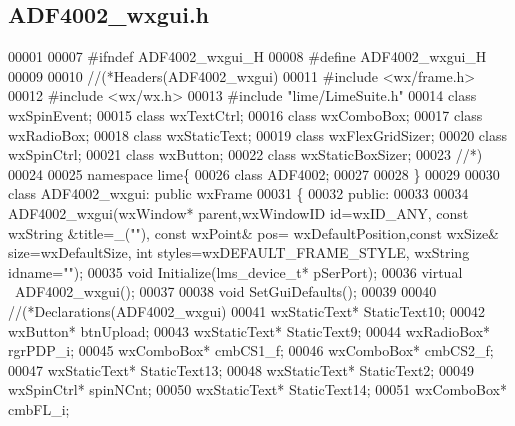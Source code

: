 \subsection{A\+D\+F4002\+\_\+wxgui.\+h}
\label{ADF4002__wxgui_8h_source}

\begin{DoxyCode}
00001 
00007 \textcolor{preprocessor}{#ifndef ADF4002\_wxgui\_H}
00008 \textcolor{preprocessor}{#define ADF4002\_wxgui\_H}
00009 
00010 \textcolor{comment}{//(*Headers(ADF4002\_wxgui)}
00011 \textcolor{preprocessor}{#include <wx/frame.h>}
00012 \textcolor{preprocessor}{#include <wx/wx.h>}
00013 \textcolor{preprocessor}{#include "lime/LimeSuite.h"}
00014 \textcolor{keyword}{class }wxSpinEvent;
00015 \textcolor{keyword}{class }wxTextCtrl;
00016 \textcolor{keyword}{class }wxComboBox;
00017 \textcolor{keyword}{class }wxRadioBox;
00018 \textcolor{keyword}{class }wxStaticText;
00019 \textcolor{keyword}{class }wxFlexGridSizer;
00020 \textcolor{keyword}{class }wxSpinCtrl;
00021 \textcolor{keyword}{class }wxButton;
00022 \textcolor{keyword}{class }wxStaticBoxSizer;
00023 \textcolor{comment}{//*)}
00024 
00025 \textcolor{keyword}{namespace }lime\{
00026 \textcolor{keyword}{class }ADF4002;
00027 
00028 \}
00029 
00030 \textcolor{keyword}{class }ADF4002_wxgui: \textcolor{keyword}{public} wxFrame
00031 \{
00032 \textcolor{keyword}{public}:
00033 
00034     ADF4002_wxgui(wxWindow* parent,wxWindowID \textcolor{keywordtype}{id}=wxID\_ANY, \textcolor{keyword}{const} wxString &title=\_(\textcolor{stringliteral}{""}), \textcolor{keyword}{const} wxPoint& pos=
      wxDefaultPosition,\textcolor{keyword}{const} wxSize& size=wxDefaultSize, \textcolor{keywordtype}{int} styles=wxDEFAULT\_FRAME\_STYLE, wxString idname=\textcolor{stringliteral}{""});
00035     \textcolor{keywordtype}{void} Initialize(lms_device_t* pSerPort);
00036     \textcolor{keyword}{virtual} ~ADF4002_wxgui();
00037 
00038     \textcolor{keywordtype}{void} SetGuiDefaults();
00039 
00040     \textcolor{comment}{//(*Declarations(ADF4002\_wxgui)}
00041     wxStaticText* StaticText10;
00042     wxButton* btnUpload;
00043     wxStaticText* StaticText9;
00044     wxRadioBox* rgrPDP_i;
00045     wxComboBox* cmbCS1_f;
00046     wxComboBox* cmbCS2_f;
00047     wxStaticText* StaticText13;
00048     wxStaticText* StaticText2;
00049     wxSpinCtrl* spinNCnt;
00050     wxStaticText* StaticText14;
00051     wxComboBox* cmbFL_i;

\end{DoxyCode}
